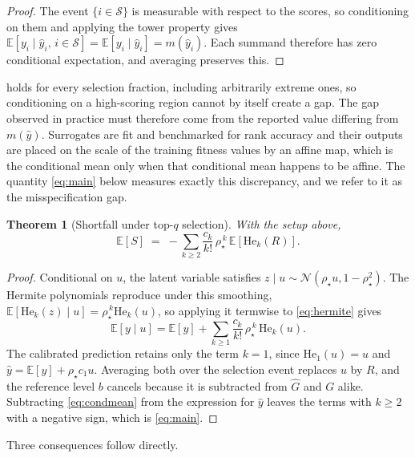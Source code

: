 \documentclass{article}
\theoremstyle{plain}
\newtheorem{theorem}{Theorem}[section]
\theoremstyle{definition}
\newcommand{\yhat}{\hat{y}}
\newcommand{\Exp}{\mathbb{E}}
\newcommand{\He}{\mathrm{He}}
\newcommand{\Normal}{\mathcal{N}}
\begin{document}
\begin{proof}
The event $\{i \in \mathcal{S}\}$ is measurable with respect to the scores, so
conditioning on them and applying the tower property gives
$\Exp[y_i \mid \yhat_i,\, i \in \mathcal{S}] = \Exp[y_i \mid \yhat_i] = m(\yhat_i)$.
Each summand therefore has zero conditional expectation, and averaging preserves this.
\end{proof}

 holds for every selection fraction, including arbitrarily extreme
ones, so conditioning on a high-scoring region cannot by itself create a gap. The gap
observed in practice must therefore come from the reported value differing from
$m(\yhat)$. Surrogates are fit and benchmarked for rank accuracy and their outputs are
placed on the scale of the training fitness values by an affine map, which is the
conditional mean only when that conditional mean happens to be affine. The quantity
\cref{eq:main} below measures exactly this discrepancy, and we refer to it as the
misspecification gap.

\begin{theorem}[Shortfall under top-$q$ selection]
\label{thm:main}
With the setup above,
\begin{equation}
\Exp[S] \;=\; -\sum_{k \ge 2} \frac{c_k}{k!}\, \rho_\star^{\,k}\,
\Exp\!\left[\He_k(R)\right].
\label{eq:main}
\end{equation}
\end{theorem}

\begin{proof}
Conditional on $u$, the latent variable satisfies $z \mid u \sim \Normal(\rho_\star u,
1-\rho_\star^2)$. The Hermite polynomials reproduce under this smoothing,
$\Exp[\He_k(z) \mid u] = \rho_\star^{\,k}\He_k(u)$, so applying it termwise to
\cref{eq:hermite} gives
\begin{equation}
\Exp[y \mid u] = \Exp[y] + \sum_{k \ge 1} \frac{c_k}{k!}\,\rho_\star^{\,k}\,\He_k(u).
\label{eq:condmean}
\end{equation}
The calibrated prediction retains only the term $k=1$, since $\He_1(u)=u$ and
$\yhat = \Exp[y] + \rho_\star c_1 u$. Averaging both over the selection event replaces
$u$ by $R$, and the reference level $b$ cancels because it is subtracted from
$\hat{G}$ and $G$ alike. Subtracting \cref{eq:condmean} from the expression for
$\yhat$ leaves the terms with $k \ge 2$ with a negative sign, which is \cref{eq:main}.
\end{proof}

Three consequences follow directly.
\end{document}
